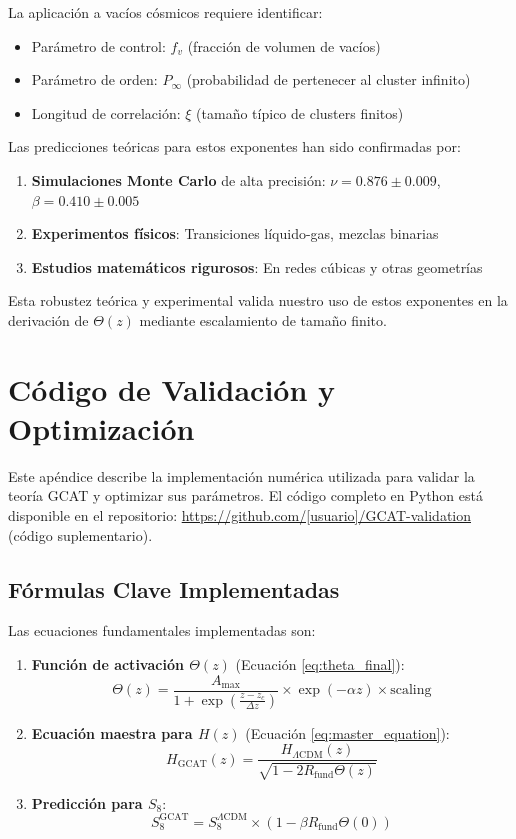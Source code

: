 \documentclass[12pt, a4paper]{article}
\theoremstyle{plain}
\theoremstyle{definition}
\begin{document}
La aplicación a vacíos cósmicos requiere identificar:
\begin{itemize}
    \item Parámetro de control: $f_v$ (fracción de volumen de vacíos)
    \item Parámetro de orden: $P_\infty$ (probabilidad de pertenecer al cluster infinito)
    \item Longitud de correlación: $\xi$ (tamaño típico de clusters finitos)
\end{itemize}

Las predicciones teóricas para estos exponentes han sido confirmadas por:
\begin{enumerate}
    \item \textbf{Simulaciones Monte Carlo} de alta precisión: $\nu = 0.876 \pm 0.009$, $\beta = 0.410 \pm 0.005$
    \item \textbf{Experimentos físicos}: Transiciones líquido-gas, mezclas binarias
    \item \textbf{Estudios matemáticos rigurosos}: En redes cúbicas y otras geometrías
\end{enumerate}

Esta robustez teórica y experimental valida nuestro uso de estos exponentes en la derivación de $\Theta(z)$ mediante escalamiento de tamaño finito.

\section{Código de Validación y Optimización}
\label{app:codigo}

Este apéndice describe la implementación numérica utilizada para validar la teoría GCAT y optimizar sus parámetros. El código completo en Python está disponible en el repositorio: \url{https://github.com/[usuario]/GCAT-validation} (código suplementario).

\subsection{Fórmulas Clave Implementadas}

Las ecuaciones fundamentales implementadas son:

\begin{enumerate}
    \item \textbf{Función de activación $\Theta(z)$} (Ecuación \ref{eq:theta_final}):
    \[
    \Theta(z) = \frac{A_{\max}}{1 + \exp\left(\frac{z - z_c}{\Delta z}\right)} \times \exp(-\alpha z) \times \text{scaling}
    \]
    
    \item \textbf{Ecuación maestra para $H(z)$} (Ecuación \ref{eq:master_equation}):
    \[
    H_{\text{GCAT}}(z) = \frac{H_{\Lambda\text{CDM}}(z)}{\sqrt{1 - 2 R_{\text{fund}} \Theta(z)}}
    \]
    
    \item \textbf{Predicción para $S_8$}:
    \[
    S_8^{\text{GCAT}} = S_8^{\Lambda\text{CDM}} \times \left(1 - \beta R_{\text{fund}} \Theta(0)\right)
    \]
\end{enumerate}
\end{document}
